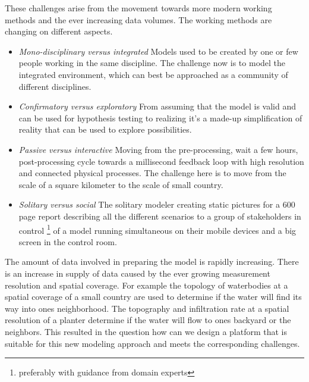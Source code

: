 \documentclass[a4paper]{article}
\begin{document}
These challenges arise from the movement towards more modern working methods and the ever increasing data volumes. The working methods are changing on different aspects.
\begin{itemize}
\item \emph{Mono-disciplinary versus integrated} Models used to be created by one or few people working in the same discipline. The challenge now is to model the integrated environment, which can best be approached as a community \citep{Voinov2010} of different disciplines.
\item \emph{Confirmatory versus exploratory} From assuming that the model is valid and can be used for hypothesis testing to realizing it's a made-up simplification of reality \citep{Oreskes1994} that can be used to explore possibilities.
\item \emph{Passive versus interactive} Moving from the pre-processing, wait a few hours, post-processing cycle towards a millisecond feedback loop with high resolution and connected physical processes. The challenge here is to move from the scale of a square kilometer \citep[for example][]{Losasso2008} to the scale of small country.
\item \emph{Solitary versus social} The solitary modeler creating static pictures for a 600 page report describing all the different scenarios to a group of stakeholders in control \footnote{preferably with guidance from domain experts} of a model running simultaneous on their mobile devices and a big screen in the control room.
\end{itemize}

The amount of data involved in preparing the model is rapidly increasing. There is an increase in supply of data caused by the ever growing measurement resolution and spatial coverage. For example the topology of waterbodies at a spatial coverage of a small country are used to determine if the water will find its way into ones neighborhood. The topography and infiltration rate at a spatial resolution of a planter determine if the water will flow to ones backyard or the neighbors.
This resulted in the question how can we design a platform that is suitable for this new modeling approach and meets the corresponding challenges.

\end{document}
